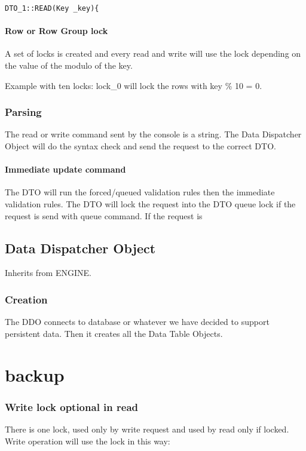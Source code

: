 \documentclass[a4paper]{article}
\begin{document}
\begin{verbatim}
DTO_1::READ(Key _key){

\end{verbatim}

\paragraph{Row or Row Group lock}
A set of locks is created and every read and write will use the lock depending
on the value of the modulo of the key.

Example with ten locks: lock\_0 will lock the rows with key \% 10 = 0.

\subsubsection{Parsing}
The read or write command sent by the console is a string. The Data Dispatcher
Object will do the syntax check and send the request to the correct DTO.
\paragraph{Immediate update command}
The DTO will run the forced/queued validation rules then the immediate
validation rules.
The DTO will lock the request into the DTO queue lock if the
request is send with queue command. If the request is 

\subsection{Data Dispatcher Object}

Inherits from ENGINE. 
\subsubsection{Creation}
The DDO connects to database or whatever we have decided to support persistent
data. Then it creates all the Data Table Objects.


\section{backup}

\subsubsection{Write lock optional in read}
There is one lock, used only by write request and used by read only if locked.
Write operation will use the lock in this way:
\end{document}
